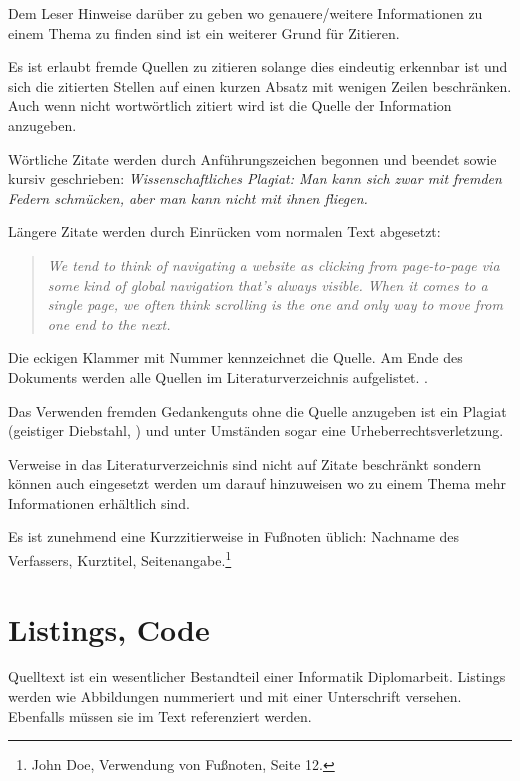 Dem Leser Hinweise darüber zu geben wo genauere/weitere Informationen zu einem Thema zu finden sind ist ein weiterer Grund für Zitieren.

Es ist erlaubt fremde Quellen zu zitieren solange dies eindeutig erkennbar ist und sich die zitierten Stellen auf einen kurzen Absatz mit wenigen Zeilen beschränken. Auch wenn nicht wortwörtlich zitiert wird ist die Quelle der Information anzugeben.

Wörtliche Zitate werden durch Anführungszeichen begonnen und beendet sowie kursiv geschrieben: 
\emph{\glqq Wissenschaftliches Plagiat: Man kann sich zwar mit fremden Federn schmücken, aber man kann nicht mit ihnen fliegen.\grqq}~\cite{bib:uhlenbruck1}


Längere Zitate werden durch Einrücken vom normalen Text abgesetzt:
\begin{quotation}
\noindent
\emph{\glqq We tend to think of navigating a website as clicking from page-to-page via some kind of global navigation that’s always visible. When it comes to a single page, we often think scrolling is the one and only way to move from one end to the next.\grqq}~\cite{bib:bradley1}
\end{quotation}

Die eckigen Klammer mit Nummer kennzeichnet die Quelle.
Am Ende des Dokuments werden alle Quellen im Literaturverzeichnis aufgelistet. \cite{bib:wikilitverz}.

Das Verwenden fremden Gedankenguts ohne die Quelle anzugeben ist ein Plagiat (geistiger Diebstahl, \cite{bib:wikiplagiat}) und unter Umständen sogar eine Urheberrechtsverletzung.


Verweise in das Literaturverzeichnis sind nicht auf Zitate beschränkt sondern können auch eingesetzt werden um darauf hinzuweisen wo zu einem Thema mehr Informationen erhältlich sind.


Es ist zunehmend eine Kurzzitierweise in Fußnoten üblich: Nachname des Verfassers, Kurztitel, Seitenangabe.\footnote{John Doe, \glqq Verwendung von Fußnoten\grqq, Seite 12.}


\section{Listings, Code}

Quelltext ist ein wesentlicher Bestandteil einer Informatik Diplomarbeit.
Listings werden wie Abbildungen nummeriert und mit einer Unterschrift versehen.
Ebenfalls müssen sie im Text referenziert werden.

